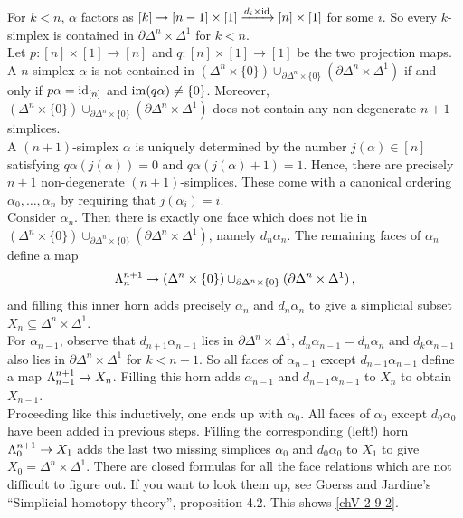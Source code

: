         For $k < n$, $\alpha$ factors as $[k] \to [n-1] \times [1] \xrightarrow{d_i \times \operatorname{id}} [n] \times [1]$ for some $i$. So every $k$-simplex is contained in $\partial \Delta^n \times \Delta^1$ for $k < n$.\\
        Let $p \colon [n] \times [1] \to [n]$ and $q \colon [n] \times [1] \to [1]$ be the two projection maps. A $n$-simplex $\alpha$ is not contained in $(\Delta^n \times \{0\}) \cup_{\partial \Delta^n \times \{0\}} (\partial \Delta^n \times \Delta^1)$ if and only if $p \alpha = \operatorname{id}_{[n]}$ and $\operatorname{im}(q \alpha) \neq \{0\}$. Moreover, $(\Delta^n \times \{0\}) \cup_{\partial \Delta^n \times \{0\}} (\partial \Delta^n \times \Delta^1)$ does not contain any non-degenerate $n+1$-simplices.\\
        A $(n+1)$-simplex $\alpha$ is uniquely determined by the number $j(\alpha) \in [n]$ satisfying $q \alpha(j(\alpha)) = 0$ and $q \alpha(j(\alpha) + 1) = 1$. Hence, there are precisely $n + 1$ non-degenerate $(n + 1)$-simplices. These come with a canonical ordering $\alpha_0, \ldots, \alpha_n$ by requiring that $j(\alpha_i) = i$.\\
        Consider $\alpha_n$. Then there is exactly one face which does not lie in $(\Delta^n \times \{0\}) \cup_{\partial \Delta^n \times \{0\}} (\partial \Delta^n \times \Delta^1)$, namely $d_n \alpha_n$. The remaining faces of $\alpha_n$ define a map
        \begin{equation*}
            \Lambda^{n+1}_{n} \to (\Delta^n \times \{0\}) \cup_{\partial \Delta^n \times \{0\}} (\partial \Delta^n \times \Delta^1) \,,
        \end{equation*}
        and filling this inner horn adds precisely $\alpha_n$ and $d_n \alpha_n$ to give a simplicial subset $X_n \subseteq \Delta^n \times \Delta^1$.\\
        For $\alpha_{n-1}$, observe that $d_{n+1} \alpha_{n-1}$ lies in $\partial \Delta^n \times \Delta^1$, $d_n \alpha_{n-1} = d_n \alpha_n$ and $d_k \alpha_{n-1}$ also lies in $\partial \Delta^n \times \Delta^1$ for $k < n - 1$. So all faces of $\alpha_{n-1}$ except $d_{n-1} \alpha_{n-1}$ define a map $\Lambda^{n+1}_{n-1} \to X_n$. Filling this horn adds $\alpha_{n-1}$ and $d_{n-1} \alpha_{n-1}$ to $X_n$ to obtain $X_{n-1}$.\\
        Proceeding like this inductively, one ends up with $\alpha_0$. All faces of $\alpha_0$ except $d_0 \alpha_0$ have been added in previous steps. Filling the corresponding (left!) horn $\Lambda^{n+1}_{0} \to X_1$ adds the last two missing simplices $\alpha_0$ and $d_0 \alpha_0$ to $X_1$ to give $X_0 = \Delta^n \times \Delta^1$. There are closed formulas for all the face relations which are not difficult to figure out. If you want to look them up, see Goerss and Jardine's ``Simplicial homotopy theory'', proposition 4.2. This shows \ref{chV-2-9-2}.\\
